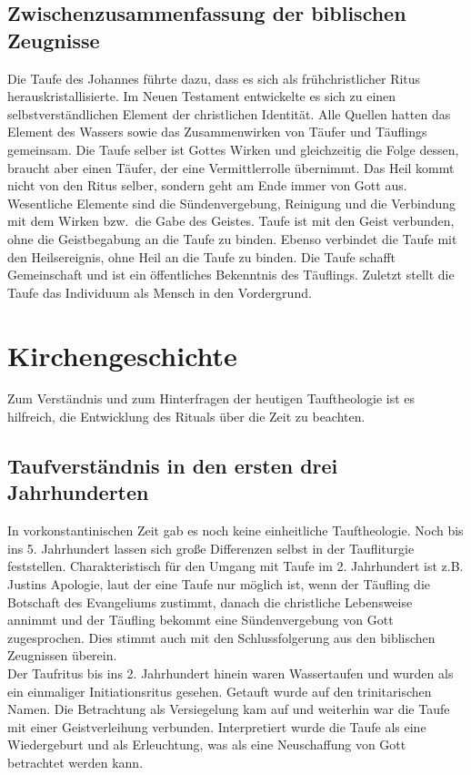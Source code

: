 \subsection{Zwischenzusammenfassung der biblischen Zeugnisse}
Die Taufe des Johannes führte dazu, dass es sich als frühchristlicher Ritus herauskristallisierte. Im Neuen Testament entwickelte es sich zu einen selbstverständlichen Element der christlichen Identität. Alle Quellen hatten das Element des Wassers sowie das Zusammenwirken von Täufer und Täuflings gemeinsam. Die Taufe selber ist Gottes Wirken und gleichzeitig die Folge dessen, braucht aber einen Täufer, der eine Vermittlerrolle übernimmt. Das Heil kommt nicht von den Ritus selber, sondern geht am Ende immer von Gott aus. Wesentliche Elemente sind die Sündenvergebung, Reinigung und die Verbindung mit dem Wirken bzw.\ die Gabe des Geistes. Taufe ist mit den Geist verbunden, ohne die Geistbegabung an die Taufe zu binden. Ebenso verbindet die Taufe mit den Heilsereignis, ohne Heil an die Taufe zu binden. Die Taufe schafft Gemeinschaft und ist ein öffentliches Bekenntnis des Täuflings. Zuletzt stellt die Taufe das Individuum als Mensch in den Vordergrund.

\section{Kirchengeschichte}
Zum Verständnis und zum Hinterfragen der heutigen Tauftheologie ist es hilfreich, die Entwicklung des Rituals über die Zeit zu beachten.

\subsection{Taufverständnis in den ersten drei Jahrhunderten}
In vorkonstantinischen Zeit gab es noch keine einheitliche Tauftheologie. Noch bis ins 5. Jahrhundert lassen sich große Differenzen selbst in der Taufliturgie feststellen. Charakteristisch für den Umgang mit Taufe im 2. Jahrhundert ist z.B. Justins Apologie, laut der eine Taufe nur möglich ist, wenn der Täufling die Botschaft des Evangeliums zustimmt, danach die christliche Lebensweise annimmt und der Täufling bekommt eine Sündenvergebung von Gott zugesprochen. Dies stimmt auch mit den Schlussfolgerung aus den biblischen Zeugnissen überein.
\\
Der Taufritus bis ins 2. Jahrhundert hinein waren Wassertaufen und wurden als ein einmaliger Initiationsritus gesehen. Getauft wurde auf den trinitarischen Namen. Die Betrachtung als Versiegelung kam auf und weiterhin war die Taufe mit einer Geistverleihung verbunden. Interpretiert wurde die Taufe als eine Wiedergeburt und als Erleuchtung, was als eine Neuschaffung von Gott betrachtet werden kann.

